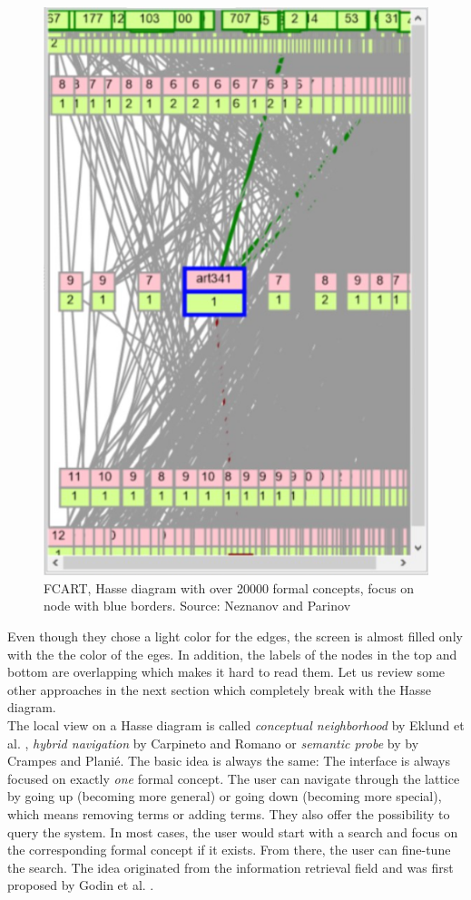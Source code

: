\documentclass[11pt]{report}
\begin{document}
\begin{figure}[!ht]
	\centering
	\includegraphics[width=0.5\linewidth]{./images/fcart}
\caption{FCART, Hasse diagram with over 20000 formal concepts, focus on node with blue borders. Source: Neznanov and Parinov \cite{Neznanov2014}}
\label{figure:fcart}
\end{figure}

Even though they chose a light color for the edges, the screen is almost filled only with the the color of the eges. In addition, the labels of the nodes in the top and bottom are overlapping which makes it hard to read them. Let us review some other approaches in the next section which completely break with the Hasse diagram. \\

The local view on a Hasse diagram is called \textit{conceptual neighborhood} by Eklund et al. \cite{Eklund2009,Eklund2012}, \textit{hybrid navigation} by Carpineto and Romano \cite{Carpineto1996} or \textit{semantic probe} by \cite{crampes2014visualizing} by Crampes and Planié. The basic idea is always the same: The interface is always focused on exactly \textit{one} formal concept. The user can navigate through the lattice by going up (becoming more general) or going down (becoming more special), which means removing terms or adding terms. They also offer the possibility to query the system. In most cases, the user would start with a search and focus on the corresponding formal concept if it exists. From there, the user can fine-tune the search. The idea originated from the information retrieval field and was first proposed by Godin et al. \cite{Godin1989}. \\
\end{document}
